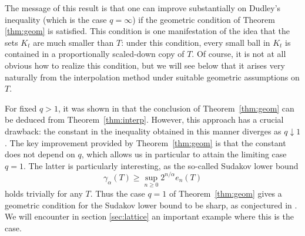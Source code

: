 \documentclass[10pt,reqno]{amsart}
\theoremstyle{definition}
\numberwithin{equation}{section}
\numberwithin{figure}{section}
\numberwithin{table}{section}
\begin{document}
The message of this result is that one can improve substantially on 
Dudley's inequality (which is the case $q=\infty$) if the geometric 
condition of Theorem \ref{thm:geom} is satisfied. This condition is one 
manifestation of the idea that the sets $K_t$ are much smaller than $T$: 
under this condition, every small ball in $K_t$ is contained in a 
proportionally scaled-down copy of $T$. Of course, it is not at all 
obvious how to realize this condition, but we will see below that it 
arises very naturally from the interpolation method under suitable 
geometric assumptions on $T$.

For fixed $q>1$, it was shown in \cite[Theorem 4.1]{vH16a} that the 
conclusion of Theorem~\ref{thm:geom} can be deduced from 
Theorem~\ref{thm:interp}. However, this approach has a crucial drawback: 
the constant in the inequality obtained in this manner diverges as 
$q\downarrow 1$. The key improvement provided by Theorem~\ref{thm:geom} is 
that the constant does not depend on $q$, which allows us in particular to 
attain the limiting case $q=1$. The latter is particularly 
interesting, as the so-called Sudakov lower bound
$$
	\gamma_\alpha(T) \ge \sup_{n\ge 0}2^{n/\alpha}e_n(T)
$$
holds trivially for any $T$. Thus the case $q=1$ of 
Theorem~\ref{thm:geom} gives a geometric condition for the Sudakov 
lower bound to be sharp, as conjectured in \cite[Remark~4.4]{vH16a}.
We will encounter in section \ref{sec:lattice} 
an important example where this is the case.
\end{document}
